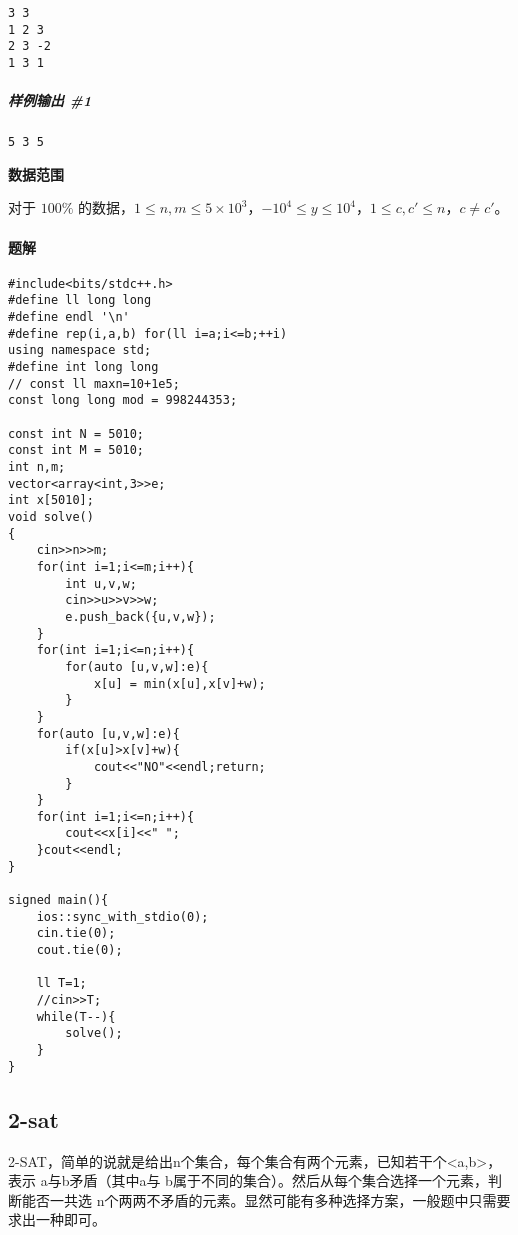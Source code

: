 \documentclass[]{article}
\let\oldparagraph\paragraph
\renewcommand{\paragraph}[1]{\oldparagraph{#1}\mbox{}}
\let\oldsubparagraph\subparagraph
\renewcommand{\subparagraph}[1]{\oldsubparagraph{#1}\mbox{}}
\begin{document}
\begin{verbatim}
3 3
1 2 3
2 3 -2
1 3 1
\end{verbatim}

\hypertarget{ux6837ux4f8bux8f93ux51fa-1}{%
\subparagraph{样例输出 \#1}\label{ux6837ux4f8bux8f93ux51fa-1}}

\begin{verbatim}
5 3 5
\end{verbatim}

\textbf{数据范围}

对于 \(100\%\)
的数据，\(1\leq n,m \leq 5\times 10^3\)，\(-10^4\leq y\leq 10^4\)，\(1\leq c,c'\leq n\)，\(c \neq c'\)。

\hypertarget{ux9898ux89e3}{%
\paragraph{题解}\label{ux9898ux89e3}}

\begin{verbatim}
#include<bits/stdc++.h>
#define ll long long
#define endl '\n'
#define rep(i,a,b) for(ll i=a;i<=b;++i)
using namespace std;
#define int long long
// const ll maxn=10+1e5;
const long long mod = 998244353;

const int N = 5010;
const int M = 5010;
int n,m;
vector<array<int,3>>e;
int x[5010];
void solve()
{   
    cin>>n>>m;
    for(int i=1;i<=m;i++){
        int u,v,w;
        cin>>u>>v>>w;
        e.push_back({u,v,w});
    }
    for(int i=1;i<=n;i++){
        for(auto [u,v,w]:e){
            x[u] = min(x[u],x[v]+w);
        }
    }
    for(auto [u,v,w]:e){
        if(x[u]>x[v]+w){
            cout<<"NO"<<endl;return;
        }
    }
    for(int i=1;i<=n;i++){
        cout<<x[i]<<" ";
    }cout<<endl;
}

signed main(){
    ios::sync_with_stdio(0);
    cin.tie(0);
    cout.tie(0);

    ll T=1; 
    //cin>>T;
    while(T--){
        solve();
    }
}
\end{verbatim}

\hypertarget{sat}{%
\subsection{2-sat}\label{sat}}

2-SAT，简单的说就是给出n个集合，每个集合有两个元素，已知若干个\textless{}a,b\textgreater{}，表示
a与b矛盾（其中a与
b属于不同的集合）。然后从每个集合选择一个元素，判断能否一共选
n个两两不矛盾的元素。显然可能有多种选择方案，一般题中只需要求出一种即可。
\end{document}
